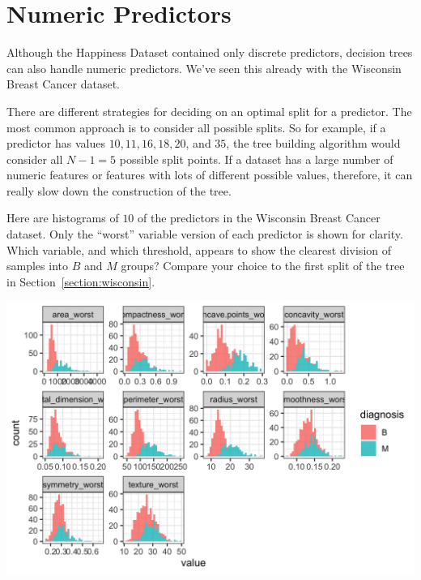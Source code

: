 
\section{Numeric Predictors}

Although the Happiness Dataset contained only discrete predictors, decision trees can also handle numeric predictors. We've seen this already with the Wisconsin Breast Cancer dataset. 

There are different strategies for deciding on an optimal split for a predictor. The most common approach is to consider all possible splits. So for example, if a predictor has values $10, 11, 16, 18, 20$, and $35$, the tree building algorithm would consider all $N-1 = 5$ possible split points. If a dataset has a large number of numeric features or features with lots of different possible values, therefore, it can really slow down the construction of the tree.
\vspace{5mm}

\begin{question}{}
Here are histograms of $10$ of the predictors in the Wisconsin Breast Cancer dataset. Only the ``worst'' variable version of each predictor is shown for clarity. Which variable, and which threshold, appears to show the clearest division of samples into $B$ and $M$ groups? Compare your choice to the first split of the tree in Section~\ref{section:wisconsin}. 
\begin{center}
\includegraphics[width=\textwidth]{img/wisconsin-variable-plots.png}
\end{center}
\end{question}

